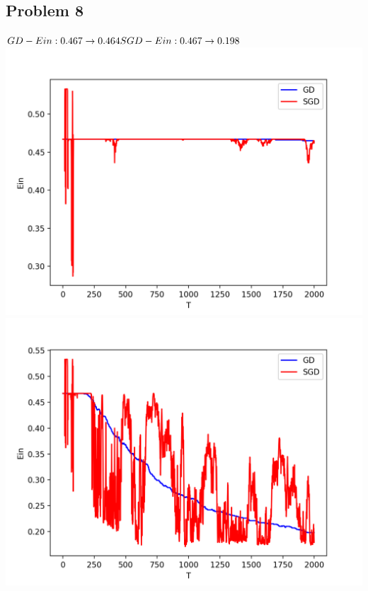 \documentclass[12pt, a4paper]{article}
\begin{document}
\begin{CJK}{UTF8}{bkai}
	\section*{Problem 8}
		$GD-Ein: 0.467 \rightarrow 0.464 \\
		SGD-Ein: 0.467 \rightarrow 0.198 $\\
		\includegraphics[width=14cm, keepaspectratio=true]{ein_8.png}\\
		\includegraphics[width=14cm, keepaspectratio=true]{ein_9.png}
	

\end{CJK}
\end{document}
